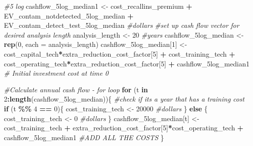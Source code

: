 \documentclass[
]{article}
\newenvironment{Shaded}{\begin{snugshade}}{\end{snugshade}}
\newcommand{\AttributeTok}[1]{\textcolor[rgb]{0.13,0.29,0.53}{#1}}
\newcommand{\CommentTok}[1]{\textcolor[rgb]{0.56,0.35,0.01}{\textit{#1}}}
\newcommand{\ControlFlowTok}[1]{\textcolor[rgb]{0.13,0.29,0.53}{\textbf{#1}}}
\newcommand{\DecValTok}[1]{\textcolor[rgb]{0.00,0.00,0.81}{#1}}
\newcommand{\FunctionTok}[1]{\textcolor[rgb]{0.13,0.29,0.53}{\textbf{#1}}}
\newcommand{\NormalTok}[1]{#1}
\newcommand{\OtherTok}[1]{\textcolor[rgb]{0.56,0.35,0.01}{#1}}
\newcommand{\SpecialCharTok}[1]{\textcolor[rgb]{0.81,0.36,0.00}{\textbf{#1}}}
\begin{document}
\begin{Shaded}
\begin{Highlighting}[]
\CommentTok{\#5 log}
\NormalTok{cashflow\_5log\_median1 }\OtherTok{\textless{}{-}}\NormalTok{ cost\_recallins\_premium }\SpecialCharTok{+}\NormalTok{ EV\_contam\_notdetected\_5log\_median }\SpecialCharTok{+}\NormalTok{ EV\_contam\_detect\_test\_5log\_median }\CommentTok{\#dollars}
\CommentTok{\#set up cash flow vector for desired analysis length}
\NormalTok{analysis\_length }\OtherTok{\textless{}{-}} \DecValTok{20} \CommentTok{\#years}
\NormalTok{cashflow\_5log\_median }\OtherTok{\textless{}{-}} \FunctionTok{rep}\NormalTok{(}\DecValTok{0}\NormalTok{, }\AttributeTok{each =}\NormalTok{ analysis\_length)}
\NormalTok{cashflow\_5log\_median[}\DecValTok{1}\NormalTok{] }\OtherTok{\textless{}{-}}\NormalTok{ cost\_capital\_tech}\SpecialCharTok{*}\NormalTok{extra\_reduction\_cost\_factor[}\DecValTok{5}\NormalTok{] }\SpecialCharTok{+}\NormalTok{ cost\_training\_tech }\SpecialCharTok{+}\NormalTok{ cost\_operating\_tech}\SpecialCharTok{*}\NormalTok{extra\_reduction\_cost\_factor[}\DecValTok{5}\NormalTok{] }\SpecialCharTok{+}\NormalTok{ cashflow\_5log\_median1   }\CommentTok{\# Initial investment cost at time 0}

\CommentTok{\#Calculate annual cash flow {-} for loop}
\ControlFlowTok{for}\NormalTok{ (t }\ControlFlowTok{in} \DecValTok{2}\SpecialCharTok{:}\FunctionTok{length}\NormalTok{(cashflow\_5log\_median))\{}
  \CommentTok{\#check if it\textquotesingle{}s a year that has a training cost}
  \ControlFlowTok{if}\NormalTok{ (t }\SpecialCharTok{\%\%} \DecValTok{4} \SpecialCharTok{==} \DecValTok{0}\NormalTok{)\{}
\NormalTok{    cost\_training\_tech }\OtherTok{\textless{}{-}} \DecValTok{20000} \CommentTok{\#dollars}
\NormalTok{  \} }\ControlFlowTok{else}\NormalTok{ \{}
\NormalTok{    cost\_training\_tech }\OtherTok{\textless{}{-}} \DecValTok{0} \CommentTok{\#dollars}
\NormalTok{  \}}
\NormalTok{  cashflow\_5log\_median[t] }\OtherTok{\textless{}{-}}\NormalTok{ cost\_training\_tech }\SpecialCharTok{+}\NormalTok{ extra\_reduction\_cost\_factor[}\DecValTok{5}\NormalTok{]}\SpecialCharTok{*}\NormalTok{cost\_operating\_tech }\SpecialCharTok{+}\NormalTok{ cashflow\_5log\_median1 }\CommentTok{\#ADD ALL THE COSTS}
\NormalTok{\}}
\end{Highlighting}
\end{Shaded}
\end{document}
